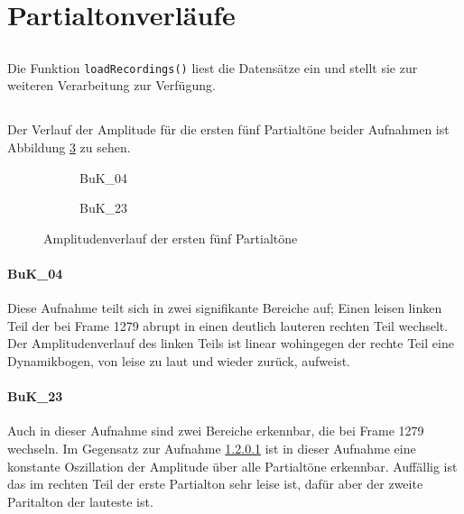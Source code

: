 \section{Partialtonverläufe}
\label{sec:1}

\subsection{}
Die Funktion \texttt{loadRecordings()} liest die Datensätze ein und stellt sie zur weiteren Verarbeitung zur Verfügung.

\subsection{}
Der Verlauf der Amplitude für die ersten fünf Partialtöne beider Aufnahmen ist Abbildung \ref{fig:ampl} zu sehen.

\begin{figure}[tbh]
    \centering
    \begin{subfigure}{.5\textwidth}
        \centering
        \caption{BuK\_04}
        \scalebox{0.5}{}
        \label{fig:sub1}
    \end{subfigure}%
    \begin{subfigure}{.5\textwidth}
        \centering
        \caption{BuK\_23}
        \scalebox{0.5}{}
        \label{fig:sub2}
    \end{subfigure}
    \caption{Amplitudenverlauf der ersten fünf Partialtöne}
    \label{fig:ampl}
\end{figure}

\paragraph{BuK\_04}
\label{par:04}
Diese Aufnahme teilt sich in zwei signifikante Bereiche auf;
Einen leisen linken Teil der bei Frame 1279 abrupt in einen deutlich lauteren rechten Teil wechselt.
Der Amplitudenverlauf des linken Teils ist linear wohingegen der rechte Teil eine Dynamikbogen, von leise zu laut und wieder zurück, aufweist.

\paragraph{BuK\_23}
Auch in dieser Aufnahme sind zwei Bereiche erkennbar, die bei Frame 1279 wechseln.
Im Gegensatz zur Aufnahme \ref{par:04} ist in dieser Aufnahme eine konstante Oszillation der Amplitude über alle Partialtöne erkennbar.
Auffällig ist das im rechten Teil der erste Partialton sehr leise ist, dafür aber der zweite Paritalton der lauteste ist.


